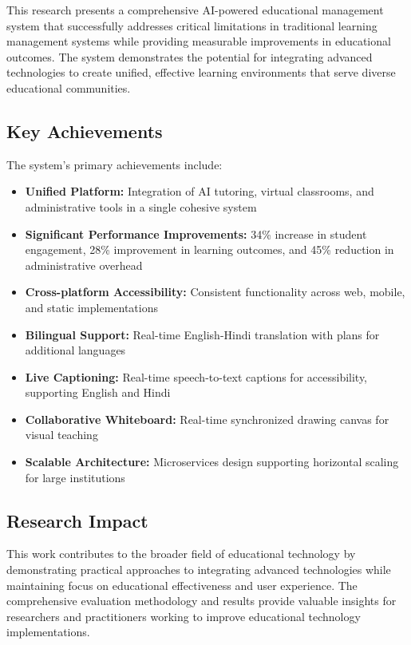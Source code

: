 \documentclass[onecolumn]{IEEEtran}
\begin{document}
This research presents a comprehensive AI-powered educational management system that successfully addresses critical limitations in traditional learning management systems while providing measurable improvements in educational outcomes. The system demonstrates the potential for integrating advanced technologies to create unified, effective learning environments that serve diverse educational communities.

\subsection{Key Achievements}

The system's primary achievements include:

\begin{itemize}
\item \textbf{Unified Platform:} Integration of AI tutoring, virtual classrooms, and administrative tools in a single cohesive system
\item \textbf{Significant Performance Improvements:} 34\% increase in student engagement, 28\% improvement in learning outcomes, and 45\% reduction in administrative overhead
\item \textbf{Cross-platform Accessibility:} Consistent functionality across web, mobile, and static implementations
\item \textbf{Bilingual Support:} Real-time English-Hindi translation with plans for additional languages
\item \textbf{Live Captioning:} Real-time speech-to-text captions for accessibility, supporting English and Hindi
\item \textbf{Collaborative Whiteboard:} Real-time synchronized drawing canvas for visual teaching
\item \textbf{Scalable Architecture:} Microservices design supporting horizontal scaling for large institutions
\end{itemize}

\subsection{Research Impact}

This work contributes to the broader field of educational technology by demonstrating practical approaches to integrating advanced technologies while maintaining focus on educational effectiveness and user experience. The comprehensive evaluation methodology and results provide valuable insights for researchers and practitioners working to improve educational technology implementations.
\end{document}
